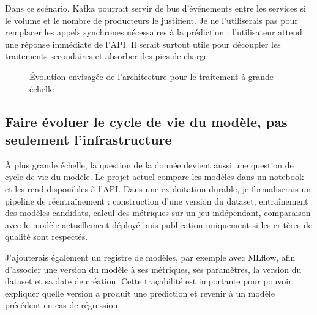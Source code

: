 Dans ce scénario, Kafka pourrait servir de bus d'événements entre les services si le volume et le nombre de producteurs le justifient. Je ne l'utiliserais pas pour remplacer les appels synchrones nécessaires à la prédiction : l'utilisateur attend une réponse immédiate de l'API. Il serait surtout utile pour découpler les traitements secondaires et absorber des pics de charge.

\begin{figure}[H]
\centering
{}
\caption{Évolution envisagée de l'architecture pour le traitement à grande échelle}
\label{fig:insurance-scale}
\end{figure}

\subsection{Faire évoluer le cycle de vie du modèle, pas seulement l'infrastructure}

À plus grande échelle, la question de la donnée devient aussi une question de cycle de vie du modèle. Le projet actuel compare les modèles dans un notebook et les rend disponibles à l'API. Dans une exploitation durable, je formaliserais un pipeline de réentraînement : construction d'une version du dataset, entraînement des modèles candidats, calcul des métriques sur un jeu indépendant, comparaison avec le modèle actuellement déployé puis publication uniquement si les critères de qualité sont respectés.

J'ajouterais également un registre de modèles, par exemple avec MLflow, afin d'associer une version du modèle à ses métriques, ses paramètres, la version du dataset et sa date de création. Cette traçabilité est importante pour pouvoir expliquer quelle version a produit une prédiction et revenir à un modèle précédent en cas de régression.

